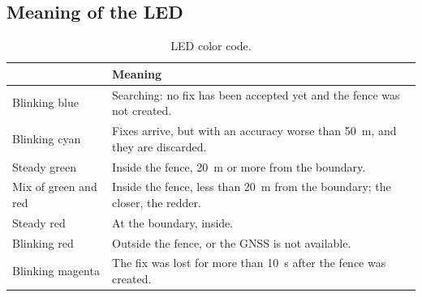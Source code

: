 \subsection{Meaning of the LED}

\begin{table}[H]
\centering
\small
\begin{tabularx}{\textwidth}{|l X|}
\hline
\tablehead{\textbf{LED} & \textbf{Meaning}} \\ \hline
Blinking blue & Searching: no fix has been accepted yet and the fence was not created. \\ \hline
Blinking cyan & Fixes arrive, but with an accuracy worse than 50~m, and they are discarded. \\ \hline
Steady green & Inside the fence, 20~m or more from the boundary. \\ \hline
Mix of green and red & Inside the fence, less than 20~m from the boundary; the closer, the redder. \\ \hline
Steady red & At the boundary, inside. \\ \hline
Blinking red & Outside the fence, or the GNSS is not available. \\ \hline
Blinking magenta & The fix was lost for more than 10~s after the fence was created. \\ \hline
\end{tabularx}
\caption{LED color code.}
\end{table}
